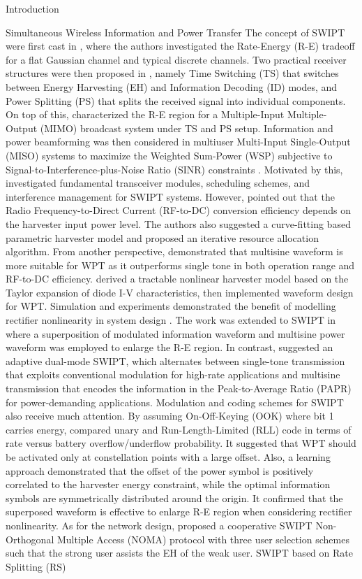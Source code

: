 \documentclass[journal]{IEEEtran}
\begin{document}
\begin{section}{Introduction}
\begin{subsection}{Simultaneous Wireless Information and Power Transfer}
			The concept of SWIPT were first cast in \cite{Varshney2008}, where the authors investigated the Rate-Energy (R-E) tradeoff for a flat Gaussian channel and typical discrete channels. Two practical receiver structures were then proposed in \cite{Zhou2013}, namely Time Switching (TS) that switches between Energy Harvesting (EH) and Information Decoding (ID) modes, and Power Splitting (PS) that splits the received signal into individual components. On top of this, \cite{Zhang2013} characterized the R-E region for a Multiple-Input Multiple-Output (MIMO) broadcast system under TS and PS setup. Information and power beamforming was then considered in multiuser Multi-Input Single-Output (MISO) systems to maximize the Weighted Sum-Power (WSP) subjective to Signal-to-Interference-plus-Noise Ratio (SINR) constraints \cite{Xu2014}. Motivated by this, \cite{Krikidis2014} investigated fundamental transceiver modules, scheduling schemes, and interference management for SWIPT systems. However, \cite{Boshkovska2015} pointed out that the Radio Frequency-to-Direct Current (RF-to-DC) conversion efficiency depends on the harvester input power level. The authors also suggested a curve-fitting based parametric harvester model and proposed an iterative resource allocation algorithm. From another perspective, \cite{Trotter2009,Boaventura2011} demonstrated that multisine waveform is more suitable for WPT as it outperforms single tone in both operation range and RF-to-DC efficiency. \cite{Clerckx2016a} derived a tractable nonlinear harvester model based on the Taylor expansion of diode I-V characteristics, then implemented waveform design for WPT. Simulation and experiments demonstrated the benefit of modelling rectifier nonlinearity in system design \cite{Kim2019,Kim2019a}. The work was extended to SWIPT in \cite{Clerckx2018} where a superposition of modulated information waveform and multisine power waveform was employed to enlarge the R-E region. In contrast, \cite{Park2018} suggested an adaptive dual-mode SWIPT, which alternates between single-tone transmission that exploits conventional modulation for high-rate applications and multisine transmission that encodes the information in the Peak-to-Average Ratio (PAPR) for power-demanding applications. Modulation and coding schemes for SWIPT also receive much attention. By assuming On-Off-Keying (OOK) where bit 1 carries energy, \cite{Hu2019} compared unary and Run-Length-Limited (RLL) code in terms of rate versus battery overflow/underflow probability. It suggested that WPT should be activated only at constellation points with a large offset. Also, a learning approach \cite{Varasteh2019c} demonstrated that the offset of the power symbol is positively correlated to the harvester energy constraint, while the optimal information symbols are symmetrically distributed around the origin. It confirmed that the superposed waveform is effective to enlarge R-E region when considering rectifier nonlinearity. As for the network design, \cite{Liu2016} proposed a cooperative SWIPT Non-Orthogonal Multiple Access (NOMA) protocol with three user selection schemes such that the strong user assists the EH of the weak user. SWIPT based on Rate Splitting (RS) 
\end{subsection}
\end{section}
\end{document}

